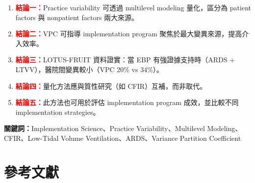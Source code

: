 \documentclass[12pt,a4paper]{article}
\begin{document}
\begin{enumerate}
    \item \textcolor{red}{\textbf{結論一：}}Practice variability 可透過 multilevel modeling 量化，區分為 patient factors 與 nonpatient factors 兩大來源。

    \item \textcolor{red}{\textbf{結論二：}}VPC 可指導 implementation program 聚焦於最大變異來源，提高介入效率。

    \item \textcolor{red}{\textbf{結論三：}}LOTUS-FRUIT 資料證實：當 EBP 有強證據支持時（ARDS + LTVV），醫院間變異較小（VPC 20\% vs 34\%）。

    \item \textcolor{red}{\textbf{結論四：}}量化方法應與質性研究（如 CFIR）互補，而非取代。

    \item \textcolor{red}{\textbf{結論五：}}此方法也可用於評估 implementation program 成效，並比較不同 implementation strategies。
\end{enumerate}

\vspace{0.5cm}
\textbf{關鍵詞：}Implementation Science、Practice Variability、Multilevel Modeling、CFIR、Low-Tidal Volume Ventilation、ARDS、Variance Partition Coefficient

\section{參考文獻}
\end{document}
